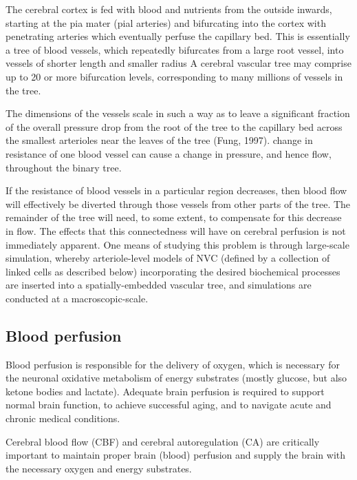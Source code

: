 \begin{mdframed}

The cerebral cortex is fed with blood and nutrients from the outside inwards,
starting at the pia mater (pial arteries) and bifurcating into the cortex with
penetrating arteries which eventually perfuse the capillary bed. This is
essentially a tree of blood vessels, which repeatedly bifurcates from a large
root vessel, into vessels of shorter length and smaller radius A cerebral
vascular tree may comprise up to 20 or more bifurcation levels, corresponding to
many millions of vessels in the tree.

\end{mdframed}


The dimensions of the vessels scale in such a way as to leave a significant
fraction of the overall pressure drop from the root of the tree to the capillary
bed across the smallest arterioles near  the leaves of the tree (Fung, 1997).
change in resistance of one blood vessel can cause a change in pressure, and
hence flow, throughout the binary tree.

If the resistance of blood vessels in a particular region decreases, then blood
flow will effectively be diverted through those vessels from other parts of the
tree. The remainder of the tree will need, to some extent, to compensate for
this decrease in flow. The effects that this connectedness will have on cerebral
perfusion is not immediately apparent.
One means of studying this problem is through large-scale simulation, whereby
arteriole-level models of NVC (defined by a collection of linked cells as
described below) incorporating the desired biochemical processes are inserted
into a spatially-embedded vascular tree, and simulations are conducted at a
macroscopic-scale.

\subsection{Blood perfusion}
\label{sec:blood-perfusion}

Blood perfusion is responsible for the delivery of oxygen, which is necessary
for the neuronal oxidative metabolism of energy substrates (mostly glucose, but
also ketone bodies and lactate). Adequate brain perfusion is required to support
normal brain function, to achieve successful aging, and to navigate acute and
chronic medical conditions.

Cerebral blood flow (CBF) and cerebral autoregulation (CA) are critically
important to maintain proper brain (blood) perfusion and supply the brain with
the necessary oxygen and energy substrates. 

